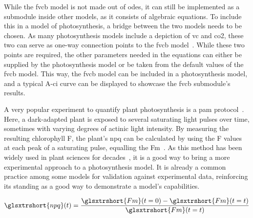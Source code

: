 While the \gls{fvcb} model is not made out of \glspl{ode}, it can still be implemented as a submodule inside other models, as it consists of algebraic equations. To include this in a model of photosynthesis, a bridge between the two models needs to be chosen. As many photosynthesis models include a depiction of \gls{vc} and \gls{co2}, these two can serve as one-way connection points to the \gls{fvcb} model~. While these two points are required, the other parameters needed in the equations can either be supplied by the photosynthesis model or be taken from the default values of the \gls{fvcb} model. This way, the \gls{fvcb} model can be included in a photosynthesis model, and a typical \gls{A}-\gls{ci} curve can be displayed to showcase the \gls{fvcb} submodule's results.

A very popular experiment to quantify plant photosynthesis is a \gls{pam} protocol~\cite{ritchieUsePulseAmplitude2010,baghbaniDevelopmentLowCostAutonomous2025}. Here, a dark-adapted plant is exposed to several saturating light pulses over time, sometimes with varying degrees of actinic light intensity. By measuring the resulting chlorophyll \gls{F}, the plant's \gls{npq} can be calculated by using the \gls{F} values at each peak of a saturating pulse, equalling the \gls{Fm}~. As this method has been widely used in plant sciences for decades~\cite{schreiberMeasurementChlorophyllFluorescence1996}, it is a good way to bring a more experimental approach to a photosynthesis model. It is already a common practice among some models for validation against experimental data, reinforcing its standing as a good way to demonstrate a model's capabilities.

\begin{equation}
  \label{eq:npq}
  \glsxtrshort{npq}(t) = \frac{\glsxtrshort{Fm}(t=0) - \glsxtrshort{Fm}(t=t)}{\glsxtrshort{Fm}(t=t)}
\end{equation}

